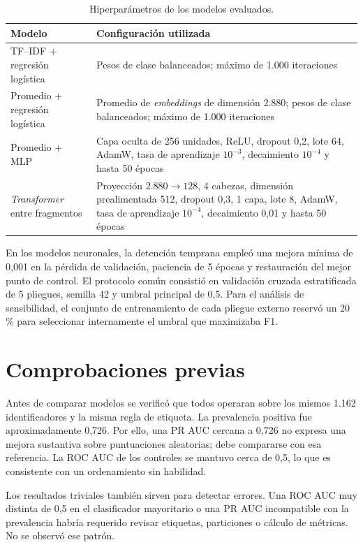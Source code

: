\begin{table}[H]
\centering
\caption{Hiperparámetros de los modelos evaluados.}
\label{tab:hiperparametros_modelos}
\small
\begin{tabular}{p{3.1cm}p{9.3cm}}
\toprule
\textbf{Modelo} & \textbf{Configuración utilizada} \\
\midrule
TF--IDF + regresión logística & Pesos de clase balanceados; máximo de 1.000 iteraciones \\
Promedio + regresión logística & Promedio de \textit{embeddings} de dimensión 2.880; pesos de clase balanceados; máximo de 1.000 iteraciones \\
Promedio + MLP & Capa oculta de 256 unidades, ReLU, dropout 0,2, lote 64, AdamW, tasa de aprendizaje $10^{-3}$, decaimiento $10^{-4}$ y hasta 50 épocas \\
\textit{Transformer} entre fragmentos & Proyección $2.880\rightarrow128$, 4 cabezas, dimensión prealimentada 512, dropout 0,3, 1 capa, lote 8, AdamW, tasa de aprendizaje $10^{-4}$, decaimiento 0,01 y hasta 50 épocas \\
\bottomrule
\end{tabular}
\end{table}

En los modelos neuronales, la detención temprana empleó una mejora mínima de 0,001 en la pérdida de validación, paciencia de 5 épocas y restauración del mejor punto de control. El protocolo común consistió en validación cruzada estratificada de 5 pliegues, semilla 42 y umbral principal de 0,5. Para el análisis de sensibilidad, el conjunto de entrenamiento de cada pliegue externo reservó un 20\,\% para seleccionar internamente el umbral que maximizaba F1.

\section{Comprobaciones previas}

Antes de comparar modelos se verificó que todos operaran sobre los mismos 1.162 identificadores y la misma regla de etiqueta. La prevalencia positiva fue aproximadamente 0,726. Por ello, una PR AUC cercana a 0,726 no expresa una mejora sustantiva sobre puntuaciones aleatorias; debe compararse con esa referencia. La ROC AUC de los controles se mantuvo cerca de 0,5, lo que es consistente con un ordenamiento sin habilidad.

Los resultados triviales también sirven para detectar errores. Una ROC AUC muy distinta de 0,5 en el clasificador mayoritario o una PR AUC incompatible con la prevalencia habría requerido revisar etiquetas, particiones o cálculo de métricas. No se observó ese patrón.

